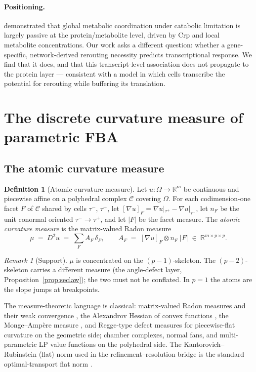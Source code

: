 \documentclass[11pt,a4paper]{article}
\theoremstyle{plain}
\theoremstyle{definition}
\newtheorem{definition}[theorem]{Definition}
\theoremstyle{remark}
\newtheorem{remark}[theorem]{Remark}
\newcommand{\CC}{\mathcal{C}}
\newcommand{\RR}{\mathbb{R}}
\begin{document}
\paragraph{Positioning.}
\citet{kochanowski2013} demonstrated that global metabolic coordination under
catabolic limitation is largely passive at the protein/metabolite level,
driven by Crp and local metabolite concentrations. Our work asks a
different question: whether a gene-specific, network-derived rerouting
necessity predicts transcriptional response. We find that it does, and that
this transcript-level association does not propagate to the protein layer
--- consistent with a model in which cells transcribe the potential for
rerouting while buffering its translation.

\section{The discrete curvature measure of parametric FBA}
\label{sec:measure}



\subsection{The atomic curvature measure}

\begin{definition}[Atomic curvature measure]\label{def:mu}
Let $u : \Omega \to \RR^m$ be continuous and piecewise affine on a
polyhedral complex $\CC$ covering $\Omega$. For each codimension-one facet
$F$ of $\CC$ shared by cells $\tau^-$, $\tau^+$, let
$[\nabla u]_F = \nabla u|_{\tau^+} - \nabla u|_{\tau^-}$, let $n_F$ be the
unit conormal oriented $\tau^- \to \tau^+$, and let $|F|$ be the facet
measure. The \emph{atomic curvature measure} is the matrix-valued Radon
measure
\[
\mu \;=\; D^2 u \;=\; \sum_{F} A_F \, \delta_F,
\qquad
A_F \;=\; [\nabla u]_F \otimes n_F \; |F| \;\in\; \RR^{m \times p \times p}.
\]
\end{definition}

\begin{remark}[Support]\label{rem:support}
$\mu$ is concentrated on the $(p-1)$-skeleton. The $(p-2)$-skeleton carries
a different measure (the angle-defect layer,
Proposition~\ref{prop:seclaw}); the two must not be conflated. In $p=1$ the
atoms are the slope jumps at breakpoints.
\end{remark}

The measure-theoretic language is classical: matrix-valued Radon
measures and their weak convergence \citep{billingsley1999}, the
Alexandrov Hessian of convex functions \citep{alexandrov1939}, the
Monge--Amp\`ere measure \citep{gutierrez2001}, and Regge-type defect
measures for piecewise-flat curvature \citep{regge1961, cheeger1984} on
the geometric side; chamber complexes, normal fans, and multi-parametric
LP value functions \citep{rockafellar1970, ziegler1995, borrelli2003} on
the polyhedral side. The Kantorovich--Rubinstein (flat) norm used in the refinement--resolution bridge is the standard optimal-transport flat norm
\citep{villani2009}.
\end{document}
